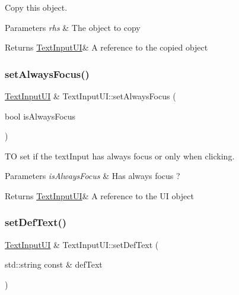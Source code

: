 Copy this object. 


\begin{DoxyParams}{Parameters}
{\em rhs} & The object to copy \\
\hline
\end{DoxyParams}
\begin{DoxyReturn}{Returns}
\hyperlink{class_text_input_u_i}{Text\+Input\+UI}\& A reference to the copied object 
\end{DoxyReturn}
\mbox{\label{class_text_input_u_i_ada177e3f531c6c8c827344615b64b9cb}} 
\subsubsection{\texorpdfstring{set\+Always\+Focus()}{setAlwaysFocus()}}
{\footnotesize\ttfamily \hyperlink{class_text_input_u_i}{Text\+Input\+UI} \& Text\+Input\+U\+I\+::set\+Always\+Focus (\begin{DoxyParamCaption}\item[{bool}]{is\+Always\+Focus }\end{DoxyParamCaption})}



TO set if the text\+Input has always focus or only when clicking. 


\begin{DoxyParams}{Parameters}
{\em is\+Always\+Focus} & Has always focus ? \\
\hline
\end{DoxyParams}
\begin{DoxyReturn}{Returns}
\hyperlink{class_text_input_u_i}{Text\+Input\+UI}\& A reference to the UI object 
\end{DoxyReturn}
\mbox{\label{class_text_input_u_i_a7014056f5805634ed5ab0f107c14d581}} 
\subsubsection{\texorpdfstring{set\+Def\+Text()}{setDefText()}}
{\footnotesize\ttfamily \hyperlink{class_text_input_u_i}{Text\+Input\+UI} \& Text\+Input\+U\+I\+::set\+Def\+Text (\begin{DoxyParamCaption}\item[{std\+::string const \&}]{def\+Text }\end{DoxyParamCaption})}



